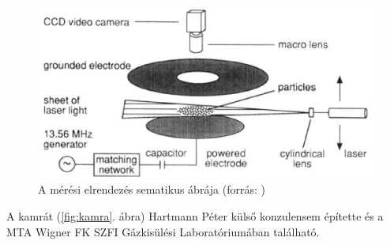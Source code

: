 	\begin{figure}[H]
		\centering
		\includegraphics[width=0.9\columnwidth]{figures/eps/dust_camera.eps}
		\caption[A mérési elrendezés sematikus ábrája]{A mérési elrendezés sematikus ábrája (forrás: \cite{Merlino2006})} 
		\label{fig:meresch}
	\end{figure}
	
	A kamrát (\ref{fig:kamra}. ábra) Hartmann Péter külső konzulensem építette és a MTA Wigner FK SZFI
	Gázkisülési Laboratóriumában található.
	
